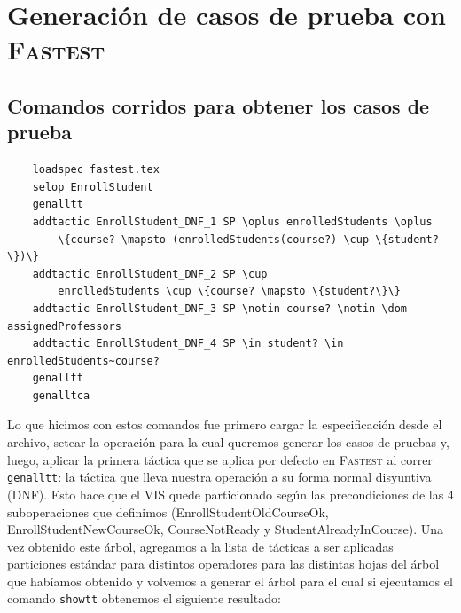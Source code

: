 \documentclass{article}
\begin{document}
\section*{Generación de casos de prueba con \textsc{Fastest}}

\subsection*{Comandos corridos para obtener los casos de prueba}

\begin{verbatim}
    loadspec fastest.tex
    selop EnrollStudent
    genalltt
    addtactic EnrollStudent_DNF_1 SP \oplus enrolledStudents \oplus 
        \{course? \mapsto (enrolledStudents(course?) \cup \{student?\})\}
    addtactic EnrollStudent_DNF_2 SP \cup 
        enrolledStudents \cup \{course? \mapsto \{student?\}\}
    addtactic EnrollStudent_DNF_3 SP \notin course? \notin \dom assignedProfessors
    addtactic EnrollStudent_DNF_4 SP \in student? \in enrolledStudents~course?
    genalltt
    genalltca    
\end{verbatim}

Lo que hicimos con estos comandos fue primero cargar la especificación desde el archivo, setear la operación para la cual queremos generar los casos de pruebas y, luego, aplicar la primera táctica que se aplica por defecto en  \textsc{Fastest} al correr \verb|genalltt|: la táctica que lleva nuestra operación a su forma normal disyuntiva (DNF). Esto hace que el VIS quede particionado según las precondiciones de las 4 suboperaciones que definimos (EnrollStudentOldCourseOk, EnrollStudentNewCourseOk, CourseNotReady y StudentAlreadyInCourse). Una vez obtenido este árbol, agregamos a la lista de tácticas a ser aplicadas particiones estándar para distintos operadores para las distintas hojas del árbol que habíamos obtenido y volvemos a generar el árbol para el cual si ejecutamos el comando \verb|showtt| obtenemos el siguiente resultado:
\end{document}
